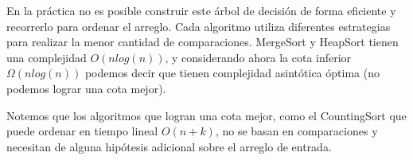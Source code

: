 En la práctica no es posible construir este árbol de decisión de forma eficiente y recorrerlo para ordenar el arreglo. Cada algoritmo utiliza diferentes estrategias para realizar la menor cantidad de comparaciones. MergeSort y HeapSort tienen una complejidad $O(n log(n))$, y considerando ahora la cota inferior $\Omega(n log(n))$ podemos decir que tienen complejidad asintótica óptima (no podemos lograr una cota mejor).

Notemos que los algoritmos que logran una cota mejor, como el CountingSort que puede ordenar en tiempo lineal $O(n+k)$, no se basan en comparaciones y necesitan de alguna hipótesis adicional sobre el arreglo de entrada.

